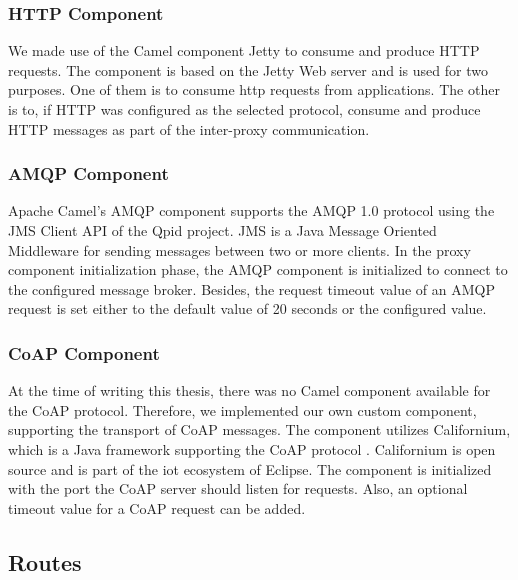 \subsubsection{HTTP Component}

We made use of the Camel component Jetty to consume and produce HTTP
requests. The component is based on the Jetty Web server\cite{jetty-homepage}
and is used for two purposes. One of them is to consume \gls{http} requests from
applications. The other is to, if HTTP was configured as the selected protocol,
consume and produce HTTP messages as part of the inter-proxy communication.

\subsubsection{AMQP Component}

Apache Camel's AMQP component supports the AMQP 1.0 protocol using the JMS
Client API of the Qpid project. JMS is a Java Message Oriented Middleware for
sending messages between two or more clients. In the proxy component
initialization phase, the AMQP component is initialized to connect to the
configured message broker. Besides, the request timeout value of an AMQP request
is set either to the default value of 20 seconds or the configured value.

\subsubsection{CoAP Component}

At the time of writing this thesis, there was no Camel component available for
the CoAP protocol. Therefore, we implemented our own custom component,
supporting the transport of CoAP messages. The component utilizes Californium,
which is a Java framework supporting the CoAP protocol
\cite{californium-homepage}. Californium is open source and is part of the
\gls{iot} ecosystem of Eclipse. The component is initialized with the port the
CoAP server should listen for requests. Also, an optional timeout value for a
CoAP request can be added.

\subsection{Routes}

